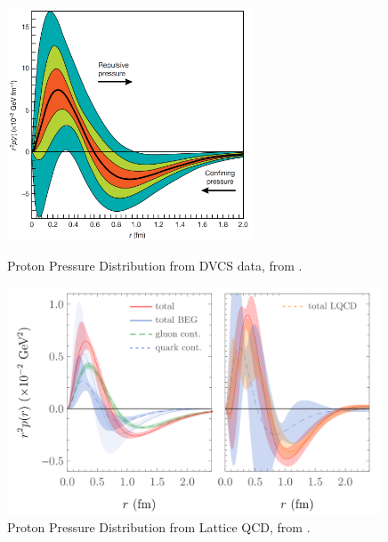         \begin{figure}[H]
        \centering
        \begin{minipage}{0.48\textwidth}
            \centering
            \includegraphics[width=0.65\textwidth]{Chapters/Ch1-Intro/Ch1-Sec2-GPDs-DVMP/pics/proton_pressure_dist.png}
            \caption[Proton Pressure Distribution, Experiment]{Proton Pressure Distribution from DVCS data, from \parencite{Burkert2018TheProton}.}
            \label{fig:proton_pressure_exp}
        \end{minipage}\hfill
        \begin{minipage}{0.48\textwidth}
            \centering
            \includegraphics[width=0.99\textwidth]{Chapters/Ch1-Intro/Ch1-Sec2-GPDs-DVMP/pics/proton_pressure_theory.png}
            \caption[Proton Pressure Distribution, Theory]{Proton Pressure Distribution from Lattice QCD, from \parencite{Shanahan2019PressureProton}.}
            \label{fig:proton_pressure_theory}
        \end{minipage}
    \end{figure}

